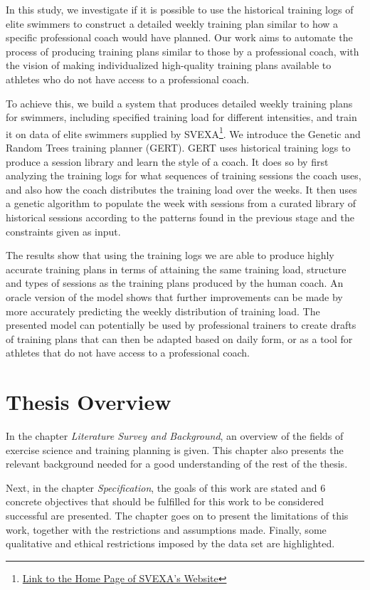 In this study, we investigate if it is possible to use the historical training logs of elite swimmers to construct a detailed weekly training plan similar to how a specific professional coach would have planned.
Our work aims to automate the process of producing training plans similar to those by a professional coach, with the vision of making individualized high-quality training plans available to athletes who do not have access to a professional coach.

To achieve this, we build a system that produces detailed weekly training plans for swimmers, including specified training load for different intensities, and train it on data of elite swimmers supplied by SVEXA\footnote{\href{https://www.svexa.com}{Link to the Home Page of SVEXA's Website}}.
We introduce the Genetic and Random Trees training planner (GERT).
GERT uses historical training logs to produce a session library and learn the style of a coach.
It does so by first analyzing the training logs for what sequences of training sessions the coach uses, and also how the coach distributes the training load over the weeks.
It then uses a genetic algorithm to populate the week with sessions from a curated library of historical sessions according to the patterns found in the previous stage and the constraints given as input.

The results show that using the training logs we are able to produce highly accurate training plans in terms of attaining the same training load, structure and types of sessions as the training plans produced by the human coach.
An oracle version of the model shows that further improvements can be made by more accurately predicting the weekly distribution of training load.
The presented model can potentially be used by professional trainers to create drafts of training plans that can then be adapted based on daily form, or as a tool for athletes that do not have access to a professional coach.

\section{Thesis Overview}
In the chapter \textit{Literature Survey and Background}, an overview of the fields of exercise science and training planning is given.
This chapter also presents the relevant background needed for a good understanding of the rest of the thesis.

Next, in the chapter \textit{Specification}, the goals of this work are stated and 6 concrete objectives that should be fulfilled for this work to be considered successful are presented.
The chapter goes on to present the limitations of this work, together with the restrictions and assumptions made.
Finally, some qualitative and ethical restrictions imposed by the data set are highlighted. 

